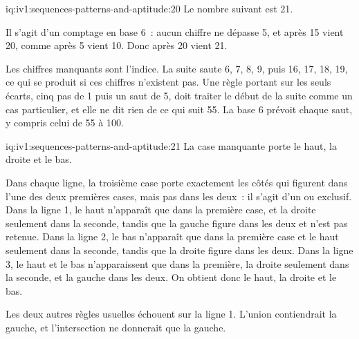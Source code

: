 \begin{solution}{iq:iv1:sequences-patterns-and-aptitude:20}
Le nombre suivant est 21.

Il s'agit d'un comptage en base 6~: aucun chiffre ne dépasse 5, et après 15 vient 20, comme après 5 vient 10. Donc après 20 vient 21.

Les chiffres manquants sont l'indice. La suite saute 6, 7, 8, 9, puis 16, 17, 18, 19, ce qui se produit si ces chiffres n'existent pas. Une règle portant sur les seuls écarts, cinq pas de 1 puis un saut de 5, doit traiter le début de la suite comme un cas particulier, et elle ne dit rien de ce qui suit 55. La base 6 prévoit chaque saut, y compris celui de 55 à 100.

\end{solution}

\begin{solution}{iq:iv1:sequences-patterns-and-aptitude:21}
La case manquante porte le haut, la droite et le bas.

Dans chaque ligne, la troisième case porte exactement les côtés qui figurent dans l'une des deux premières cases, mais pas dans les deux~: il s'agit d'un ou exclusif. Dans la ligne 1, le haut n'apparaît que dans la première case, et la droite seulement dans la seconde, tandis que la gauche figure dans les deux et n'est pas retenue. Dans la ligne 2, le bas n'apparaît que dans la première case et le haut seulement dans la seconde, tandis que la droite figure dans les deux. Dans la ligne 3, le haut et le bas n'apparaissent que dans la première, la droite seulement dans la seconde, et la gauche dans les deux. On obtient donc le haut, la droite et le bas.

Les deux autres règles usuelles échouent sur la ligne 1. L'union contiendrait la gauche, et l'intersection ne donnerait que la gauche.

\end{solution}

